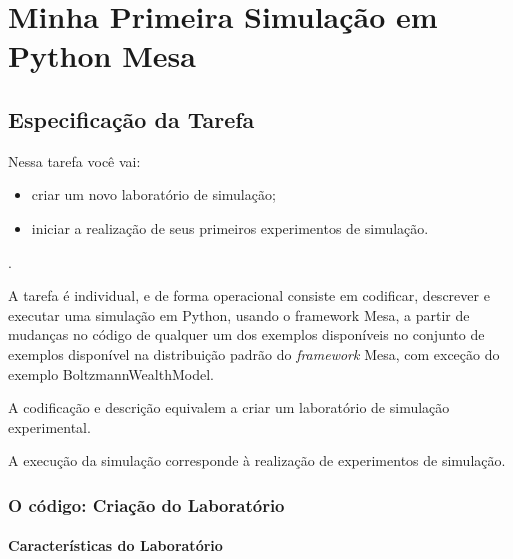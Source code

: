 \chapter{Minha Primeira Simulação em Python Mesa}

\section{Especificação da Tarefa} 

Nessa tarefa você vai:
\begin{itemize}
    \item criar um novo laboratório de simulação;
    \item iniciar a realização de seus primeiros experimentos de simulação.
\end{itemize}.

A tarefa é individual, e de forma operacional consiste em codificar, descrever e executar uma simulação em Python, usando o framework Mesa, a partir de mudanças no código de qualquer um dos exemplos disponíveis no conjunto de exemplos disponível na distribuição padrão do \textit{framework} Mesa, com exceção do exemplo BoltzmannWealthModel.

A codificação e descrição equivalem a criar um laboratório de simulação experimental.

A execução da simulação corresponde à realização de experimentos de simulação.

\subsection{O código: Criação do Laboratório}

\subsubsection{Características do Laboratório}

